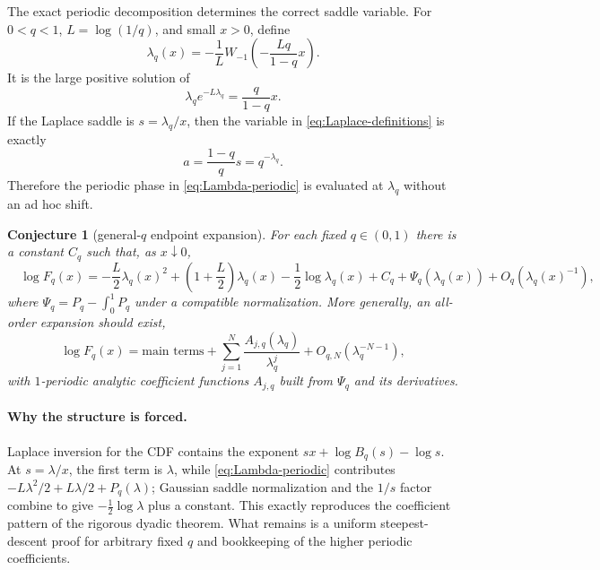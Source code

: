 \documentclass[11pt]{article}
\newtheorem{conjecture}[theorem]{Conjecture}
\theoremstyle{definition}
\theoremstyle{remark}
\begin{document}
The exact periodic decomposition determines the correct saddle variable.  For $0<q<1$, $L=\log(1/q)$, and small $x>0$, define
\begin{equation}\label{eq:lambda-q}
 \lambda_q(x)=-\frac1L
 W_{-1}\!\left(-\frac{Lq}{1-q}x\right).
\end{equation}
It is the large positive solution of
\begin{equation}\label{eq:lambda-relation}
 \lambda_qe^{-L\lambda_q}=\frac{q}{1-q}x.
\end{equation}
If the Laplace saddle is $s=\lambda_q/x$, then the variable in \cref{eq:Laplace-definitions} is exactly
\[
 a=\frac{1-q}{q}s=q^{-\lambda_q}.
\]
Therefore the periodic phase in \cref{eq:Lambda-periodic} is evaluated at $\lambda_q$ without an ad hoc shift.

\begin{conjecture}[general-$q$ endpoint expansion]\label{conj:general-q-endpoint}
For each fixed $q\in(0,1)$ there is a constant $C_q$ such that, as $x\downarrow0$,
\begin{equation}\label{eq:general-q-endpoint}
 \boxed{\quad
 \log F_q(x)=
 -\frac L2\lambda_q(x)^2
 +\left(1+\frac L2\right)\lambda_q(x)
 -\frac12\log\lambda_q(x)
 +C_q+\Psi_q(\lambda_q(x))
 +O_q(\lambda_q(x)^{-1}),
 \quad}
\end{equation}
where $\Psi_q=P_q-\int_0^1P_q$ under a compatible normalization.  More generally, an all-order expansion should exist,
\begin{equation}\label{eq:all-order-endpoint}
 \log F_q(x)=\text{main terms}
 +\sum_{j=1}^N\frac{A_{j,q}(\lambda_q)}{\lambda_q^j}
 +O_{q,N}(\lambda_q^{-N-1}),
\end{equation}
with $1$-periodic analytic coefficient functions $A_{j,q}$ built from $\Psi_q$ and its derivatives.
\end{conjecture}

\paragraph{Why the structure is forced.}
Laplace inversion for the CDF contains the exponent
$sx+\log B_q(s)-\log s$.  At $s=\lambda/x$, the first term is $\lambda$, while \cref{eq:Lambda-periodic} contributes
$-L\lambda^2/2+L\lambda/2+P_q(\lambda)$; Gaussian saddle normalization and the $1/s$ factor combine to give $-\tfrac12\log\lambda$ plus a constant.  This exactly reproduces the coefficient pattern of the rigorous dyadic theorem.  What remains is a uniform steepest-descent proof for arbitrary fixed $q$ and bookkeeping of the higher periodic coefficients.
\end{document}
